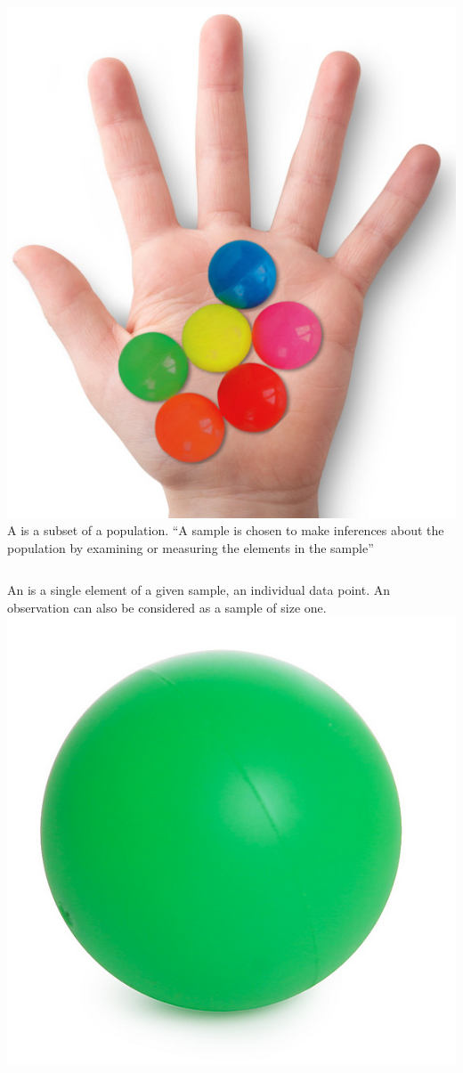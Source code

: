 \documentclass[10pt]{beamer}
\begin{document}
\begin{frame}
\begin{columns}
    \includegraphics[width=1\textwidth]{img/ballhand}
     A  is a subset of a
    population. ``A sample is chosen to make inferences about the
    population by examining or measuring the elements in the sample''
  \end{columns}
  \vspace{.6cm}
  \begin{columns}
     An  is a single
      element of a given sample, an individual data point. An
      observation can also be considered as a sample of size one.
      \includegraphics[width=1\textwidth]{img/greenball}

\end{columns}
\end{frame}
\end{document}

